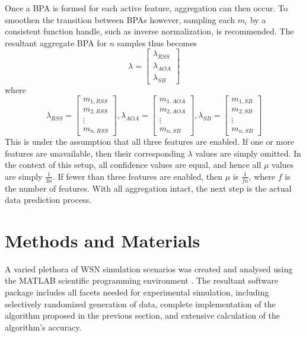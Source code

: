 \documentclass[12pt]{uthesis-v12}  %
\begin{document}
Once a BPA is formed for each active feature, aggregation can then occur. To smoothen the transition between BPAs however, sampling each $m_i$ by a consistent function handle, such as inverse normalization, is recommended. The resultant aggregate BPA for $n$ samples thus becomes
\begin{equation}
\lambda = \begin{bmatrix*}
\lambda_{RSS} \\
\lambda_{AOA} \\
\lambda_{SB} \end{bmatrix*}
\label{m}
\end{equation}
where
\begin{equation}
\lambda_{RSS} = \begin{bmatrix*}
m_{1,RSS} \\
m_{2,RSS} \\
\vdots \\
m_{n,RSS} \end{bmatrix*},
\lambda_{AOA} = \begin{bmatrix*}
m_{1,AOA} \\
m_{2,AOA} \\
\vdots \\
m_{n,SB} \end{bmatrix*},
\lambda_{SB} = \begin{bmatrix*}
m_{1,SB} \\
m_{2,SB} \\
\vdots \\
m_{n,SB} \end{bmatrix*}
\label{m}
\end{equation}
\noindent This is under the assumption that all three features are enabled. If one or more features are unavailable, then their corresponding $\lambda$ values are simply omitted. In the context of this setup, all confidence values are equal, and hence all $\mu$ values are simply $\frac{1}{3n}$. If fewer than three features are enabled, then $\mu$ is $\frac{1}{fn}$, where $f$ is the number of features. With all aggregation intact, the next step is the actual data prediction process.

\section{Methods and Materials}

A varied plethora of WSN simulation scenarios was created and analysed using the MATLAB scientific programming environment \cite{matlab}. The resultant software package includes all facets needed for experimental simulation, including selectively randomized generation of data, complete implementation of the algorithm proposed in the previous section, and extensive calculation of the algorithm's accuracy.
\end{document}
